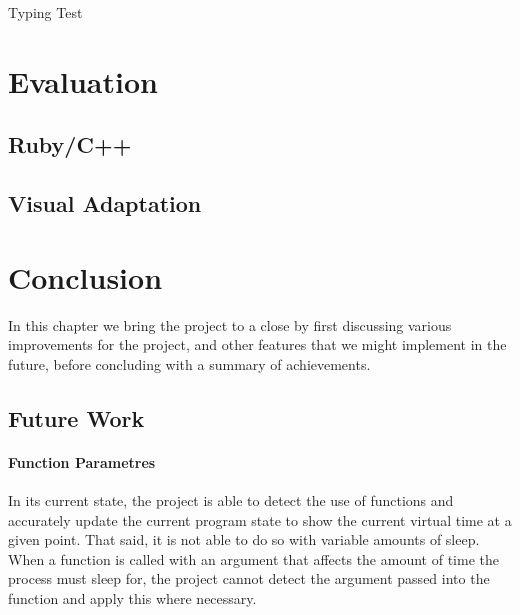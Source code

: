\documentclass[11pt]{scrartcl}
\begin{document}
Typing Test
\newpage

\section{Evaluation}
\subsection{Ruby/C++}




\subsection{Visual Adaptation}


\newpage

\section{Conclusion}
In this chapter we bring the project to a close by first discussing various 
improvements for the project, and other features that we might implement 
in the future, before concluding with a summary of achievements. 

\subsection{Future Work}
\paragraph{Function Parametres}
In its current state, the project is able to detect the use of functions
and accurately update the current program state to show the current virtual
time at a given point. That said, it is not able to do so with variable
amounts of sleep. When a function is called with an argument that affects the
amount of time the process must sleep for, the project cannot detect the
argument passed into the function and apply this where necessary.
\end{document}
